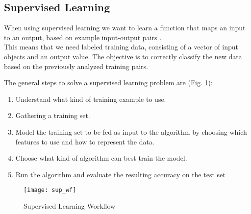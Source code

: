 \subsection{Supervised Learning} \label{supervised}
When using supervised learning we want to learn a function that maps an input to an output, based on example input-output pairs \cite{ai_sup}. \\
This means that we need labeled training data, consisting of a vector of input objects and an output value. The objective is to correctly classify the new data based on the previously analyzed training pairs.

The general steps to solve a supervised learning problem are (Fig. \ref{fig:sup_wf}):
\begin{enumerate}[noitemsep]
	\item Understand what kind of training example to use.
	\item Gathering a training set.
	\item Model the training set to be fed as input to the algorithm by choosing which features to use and how to represent the data.
	\item Choose what kind of algorithm can best train the model.
	\item Run the algorithm and evaluate the resulting accuracy on the test set 
\end{enumerate}

\begin{figure}[H]
	\centering
	\texttt{[image: sup\_wf]}
	\caption{Supervised Learning Workflow \cite{sup_wf}}
	\label{fig:sup_wf}
\end{figure}

